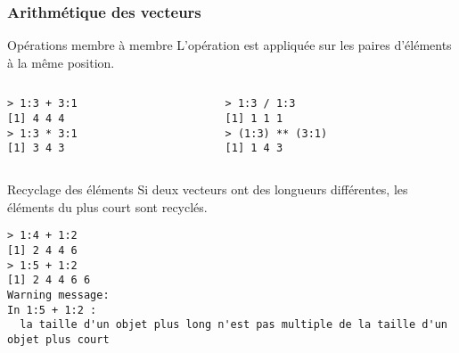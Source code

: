 \documentclass[10pt]{beamer}
\begin{document}
\begin{frame}[fragile]
  \frametitle{Arithmétique des vecteurs}
  \begin{block}{Opérations membre à membre}
    L'opération est appliquée sur les paires d'éléments à la même position.

\begin{columns}[t]
\begin{column}{0.48\textwidth}
    \begin{lstlisting}
> 1:3 + 3:1
[1] 4 4 4
> 1:3 * 3:1
[1] 3 4 3
    \end{lstlisting}
\end{column}
\begin{column}{0.48\textwidth}
    \begin{lstlisting}
> 1:3 / 1:3
[1] 1 1 1
> (1:3) ** (3:1)
[1] 1 4 3
    \end{lstlisting}
\end{column}
\end{columns}
  \end{block}

  \begin{block}{Recyclage des éléments}
    Si deux vecteurs ont des longueurs différentes, les éléments du plus court sont recyclés.
    \begin{lstlisting}
> 1:4 + 1:2
[1] 2 4 4 6
> 1:5 + 1:2
[1] 2 4 4 6 6
Warning message:
In 1:5 + 1:2 :
  la taille d'un objet plus long n'est pas multiple de la taille d'un objet plus court
\end{lstlisting}
  \end{block}
\end{frame}
\end{document}
